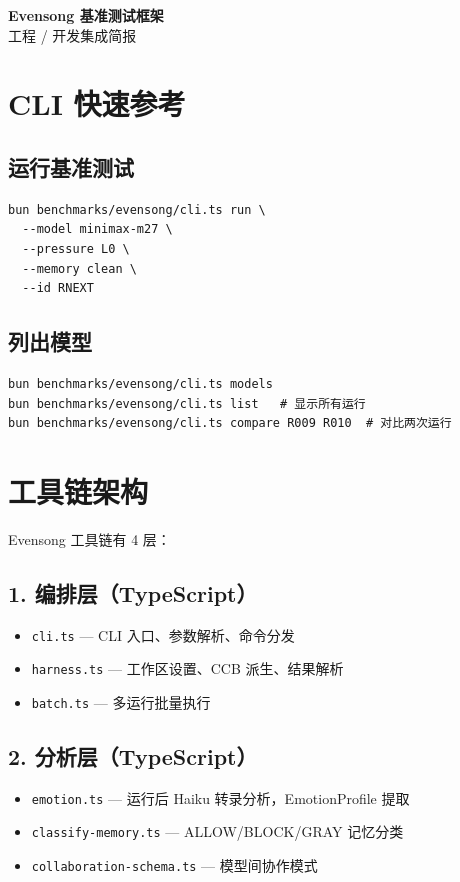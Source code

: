 \documentclass[11pt,a4paper]{article}
\begin{document}
\begin{center}
{\fontsize{22pt}{28pt}\selectfont\sffamily\bfseries\color{deep}Evensong 基准测试框架}\\
{\fontsize{11pt}{14pt}\selectfont\sffamily\color{gray}工程 / 开发集成简报}
\end{center}
\vspace{2mm}{\color{deep}\rule{\textwidth}{0.5pt}}\vspace{2mm}

\section{CLI 快速参考}

\subsection{运行基准测试}
\begin{verbatim}
bun benchmarks/evensong/cli.ts run \
  --model minimax-m27 \
  --pressure L0 \
  --memory clean \
  --id RNEXT
\end{verbatim}

\subsection{列出模型}
\begin{verbatim}
bun benchmarks/evensong/cli.ts models
bun benchmarks/evensong/cli.ts list   # 显示所有运行
bun benchmarks/evensong/cli.ts compare R009 R010  # 对比两次运行
\end{verbatim}

\section{工具链架构}

Evensong 工具链有 4 层：

\subsection{1. 编排层（TypeScript）}
\begin{itemize}
  \item \texttt{cli.ts} — CLI 入口、参数解析、命令分发
  \item \texttt{harness.ts} — 工作区设置、CCB 派生、结果解析
  \item \texttt{batch.ts} — 多运行批量执行
\end{itemize}

\subsection{2. 分析层（TypeScript）}
\begin{itemize}
  \item \texttt{emotion.ts} — 运行后 Haiku 转录分析，EmotionProfile 提取
  \item \texttt{classify-memory.ts} — ALLOW/BLOCK/GRAY 记忆分类
  \item \texttt{collaboration-schema.ts} — 模型间协作模式
\end{itemize}
\end{document}
